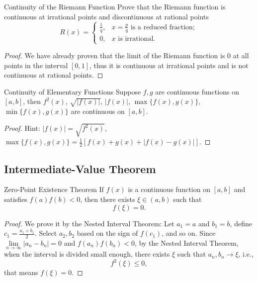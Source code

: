 \begin{example}{Continuity of the Riemann Function}{}
  Prove that the Riemann function is continuous at irrational points
  and discontinuous at rational points
  \begin{equation}
    R(x) =
    \begin{cases}
      \frac{1}{q}, & x = \frac{p}{q} \text{ is a reduced fraction};\\
      0, & x \text{ is irrational}.
    \end{cases}
  \end{equation}
\end{example}

\begin{proof}
  We have already proven that the limit of the Riemann function is $0$
  at all points in the interval $[0, 1]$,
  thus it is continuous at irrational points and is not continuous at rational points.
\end{proof}

\begin{proposition}{Continuity of Elementary Functions}{}
  Suppose $f, g$ are continuous functions on $[a, b]$,
  then $f^2(x)$, $\sqrt{|f(x)|}$, $|f(x)|$, $\max\{f(x), g(x)\}$, $\min \{f(x), g(x)\}$
  are continuous on $[a, b]$.
\end{proposition}

\begin{proof}
  Hint: $|f(x)| = \sqrt{f^2(x)}$,
  $\max \{f(x), g(x)\} = \frac{1}{2} \left[f(x) + g(x) + |f(x) - g(x)| \right]$.
\end{proof}

\subsection{Intermediate-Value Theorem}

\begin{theorem}{Zero-Point Existence Theorem}{}
  If $f(x)$ is a continuous function on $[a, b]$ and satisfies $f(a)f(b) < 0$,
  then there exists $\xi \in (a, b)$ such that
  \begin{equation}
    f(\xi) = 0.
  \end{equation}
\end{theorem}

\begin{proof}
  We prove it by the Nested Interval Theorem:
  Let $a_1 = a$ and $b_1 = b$, define $c_1 = \frac{a_1 + b_1}{2}$.
  Select $a_2, b_2$ based on the sign of $f(c_1)$,
  and so on.
  Since $\lim \limits _{n \rightarrow \infty} |a_n - b_n| = 0$ and $f(a_n)f(b_n)
  < 0$, by the Nested Interval Theorem,
  when the interval is divided small enough,
  there exists $\xi$ such that $a_n, b_n \rightarrow \xi$, i.e.,
  \begin{equation}
    f^2(\xi) \leq 0,
  \end{equation}
  that means $f(\xi) = 0$.
\end{proof}

